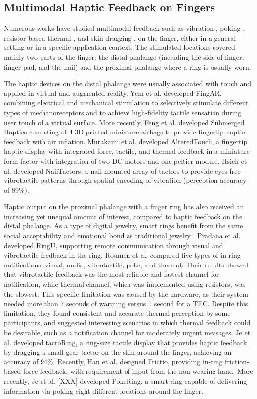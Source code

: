\documentclass[preprint,12pt]{elsarticle}
\begin{document}
\subsection{Multimodal Haptic Feedback on Fingers}
Numerous works have studied multimodal feedback such as vibration \cite{12,24}, poking \cite{24}, resistor-based thermal \cite{24}, and skin dragging \cite{13}, on the finger, either in a general setting or in a specific application context. The stimulated locations covered mainly two parts of the finger: the distal phalange (including the side of finger, finger pad, and the nail) and the proximal phalange where a ring is usually worn.

The haptic devices on the distal phalange were usually associated with touch and applied in virtual and augmented reality. Yem et al. \cite{44} developed FingAR, combining electrical and mechanical stimulation to selectively stimulate different types of mechanoreceptors and to achieve high-fidelity tactile sensation during user touch of a virtual surface. More recently, Feng et al. \cite{5} developed Submerged Haptics consisting of 4 3D-printed miniature airbags to provide fingertip haptic feedback with air inflation. Murakami et al. \cite{32} developed AlteredTouch, a fingertip haptic display with integrated force, tactile, and thermal feedback in a miniature form factor with  integration of two DC motors and one peltier module. Hsieh et al. \cite{12} developed NailTactors, a nail-mounted array of tactors to provide eyes-free vibrotactile patterns through spatial encoding of vibration (perception accuracy of 89\%).

Haptic output on the proximal phalange with a finger ring has also received an increasing yet unequal amount of interest, compared to haptic feedback on the distal phalange. As a type of digital jewelry, smart rings benefit from the same social acceptability and emotional bond as traditional jewelry \cite{21}. Pradana et al. \cite{22} developed RingU, supporting remote communication through visual and  vibrotactile feedback in the ring. Roumen et al. \cite{24} compared five types of in-ring notifications: visual, audio, vibrotactile, poke, and thermal. Their results showed that vibrotactile feedback was the most reliable and fastest channel for notification, while thermal channel, which was implemented using resistors, was the slowest. This specific limitation was caused by the hardware, as their system needed more than 7 seconds of warming versus 1 second for a TEC. Despite this limitation, they found consistent and accurate thermal perception by some participants, and suggested interesting scenarios in which thermal feedback could be desirable, such as a notification channel for moderately urgent messages. Je et al. \cite{13} developed tactoRing, a ring-size tactile display that provides haptic feedback by dragging a small gear tactor on the skin around the finger, achieving an accuracy of 94\%. Recently, Han et al. \cite{11} designed Frictio, providing in-ring friction-based force feedback, with requirement of input from the non-wearing hand. More recently, Je et al. [XXX] developed PokeRing,  a smart-ring capable of delivering information via poking eight different locations around the finger.
\end{document}
